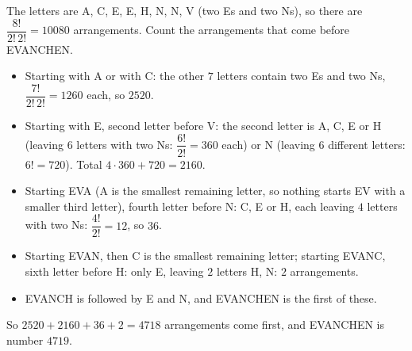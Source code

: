 The letters are A, C, E, E, H, N, N, V (two Es and two Ns), so there are $\dfrac{8!}{2!\,2!}=10080$ arrangements. Count the arrangements that come before EVANCHEN.
\begin{itemize}
\item Starting with A or with C: the other $7$ letters contain two Es and two Ns, $\dfrac{7!}{2!\,2!}=1260$ each, so $2520$.
\item Starting with E, second letter before V: the second letter is A, C, E or H (leaving $6$ letters with two Ns: $\dfrac{6!}{2!}=360$ each) or N (leaving $6$ different letters: $6!=720$). Total $4\cdot360+720=2160$.
\item Starting EVA (A is the smallest remaining letter, so nothing starts EV with a smaller third letter), fourth letter before N: C, E or H, each leaving $4$ letters with two Ns: $\dfrac{4!}{2!}=12$, so $36$.
\item Starting EVAN, then C is the smallest remaining letter; starting EVANC, sixth letter before H: only E, leaving $2$ letters H, N: $2$ arrangements.
\item EVANCH is followed by E and N, and EVANCHEN is the first of these.
\end{itemize}
So $2520+2160+36+2=4718$ arrangements come first, and EVANCHEN is number $\boxed{4719}$.
